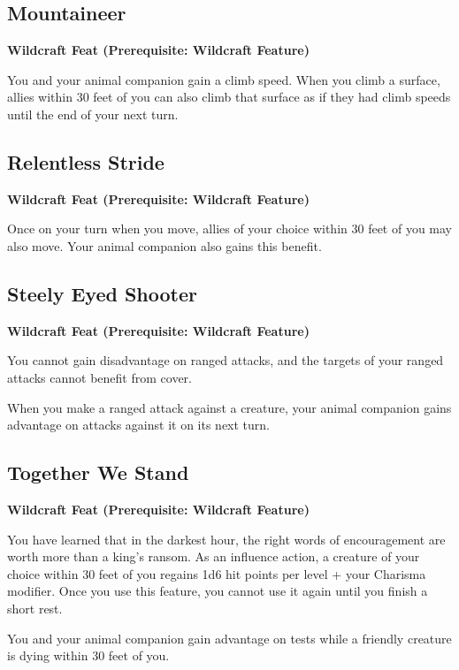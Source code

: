 \documentclass[12pt,letterpaper,twocolumn,openany,nodeprecatedcode,bg=none]{dndbook}
\begin{document}
\subsection{Mountaineer}\label{mountaineer}

\textbf{Wildcraft Feat (Prerequisite: Wildcraft Feature)}

You and your animal companion gain a climb speed. When you climb a
surface, allies within 30 feet of you can also climb that surface as if
they had climb speeds until the end of your next turn.

\subsection{Relentless Stride}\label{relentless-stride}

\textbf{Wildcraft Feat (Prerequisite: Wildcraft Feature)}

Once on your turn when you move, allies of your choice within 30 feet of
you may also move. Your animal companion also gains this benefit.

\subsection{Steely Eyed Shooter}\label{steely-eyed-shooter}

\textbf{Wildcraft Feat (Prerequisite: Wildcraft Feature)}

You cannot gain disadvantage on ranged attacks, and the targets of your
ranged attacks cannot benefit from cover.

When you make a ranged attack against a creature, your animal companion
gains advantage on attacks against it on its next turn.

\subsection{Together We Stand}\label{together-we-stand}

\textbf{Wildcraft Feat (Prerequisite: Wildcraft Feature)}

You have learned that in the darkest hour, the right words of
encouragement are worth more than a king's ransom. As an influence
action, a creature of your choice within 30 feet of you regains 1d6 hit
points per level + your Charisma modifier. Once you use this feature,
you cannot use it again until you finish a short rest.

You and your animal companion gain advantage on tests while a friendly
creature is dying within 30 feet of you.
\end{document}
